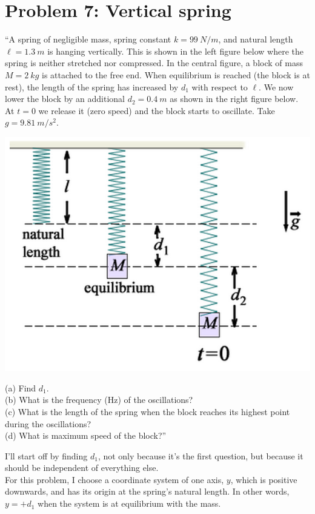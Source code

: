 \documentclass[8.01x]{subfiles}
\begin{document}
\section{Problem 7: Vertical spring}

``A spring of negligible mass, spring constant $k = \SI{99}{N/m}$, and natural length $\ell = \SI{1.3}{m}$ is hanging vertically. This is shown in the left figure below where the spring is neither stretched nor compressed. In the central figure, a block of mass $M = \SI{2}{kg}$ is attached to the free end. When equilibrium is reached (the block is at rest), the length of the spring has increased by $d_1$ with respect to $\ell$. We now lower the block by an additional $d_2 = \SI{0.4}{m}$ as shown in the right figure below. At $t = 0$ we release it (zero speed) and the block starts to oscillate. Take $g = \SI{9.81}{m/s^2}$.

\begin{center}
\includegraphics[scale=0.6]{Graphics/h4p7}
\end{center}

(a) Find $d_1$.\\
(b) What is the frequency (Hz) of the oscillations?\\
(c) What is the length of the spring when the block reaches its highest point during the oscillations?\\
(d) What is maximum speed of the block?''

I'll start off by finding $d_1$, not only because it's the first question, but because it should be independent of everything else.\\
For this problem, I choose a coordinate system of one axis, $y$, which is positive downwards, and has its origin at the spring's natural length. In other words, $y = + d_1$ when the system is at equilibrium with the mass.
\end{document}
